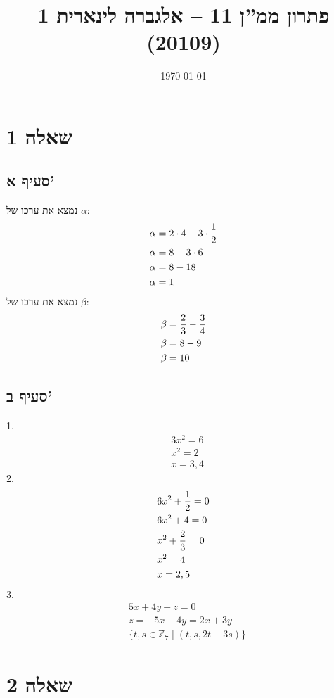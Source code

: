 \documentclass[a4paper, 10pt]{article}
\title{פתרון ממ''ן 11 – אלגברה לינארית 1 (20109)}
\author{\AUTHOR}
\date{\today}
\begin{document}
\begin{hebrew}
	\maketitle
	\section{שאלה 1}
	\subsection{סעיף א'}
נמצא את ערכו של $\alpha$:
	\[
		\begin{aligned}
			& \alpha = 2 \cdot 4 - 3 \cdot {1 \over 2} \\
			& \alpha = 8 - 3 \cdot 6 \\
			& \alpha = 8 - 18 \\
			& \alpha = 1
		\end{aligned}
	\]
	נמצא את ערכו של $\beta$:
	\[
		\begin{aligned}
			& \beta = {2 \over 3} - {3 \over 4} \\
			& \beta = 8 - 9 \\
			& \beta = 10
		\end{aligned}
	\]

	\subsection{סעיף ב'}
	1.
	\[
		\begin{aligned}
			& 3x^2 = 6 \\
			& x^2 = 2 \\
			& x = 3, 4
		\end{aligned}
	\]
	2.
	\[
		\begin{aligned}
			& 6x^2 + {1 \over 2} = 0 \\
			& 6x^2 + 4 = 0 \\
			& x^2 + {2 \over 3} = 0 \\
			& x^2 = 4 \\
			& x = 2, 5
		\end{aligned}
	\]
	3.
	\[
		\begin{aligned}
			& 5x + 4y + z = 0 \\
			& z = -5x - 4y = 2x + 3y \\
			& \{ t, s \in \mathbb{Z}_7 \mid (t, s, 2t + 3s) \}
		\end{aligned}
	\]

	\section{שאלה 2}

\end{hebrew}
\end{document}
